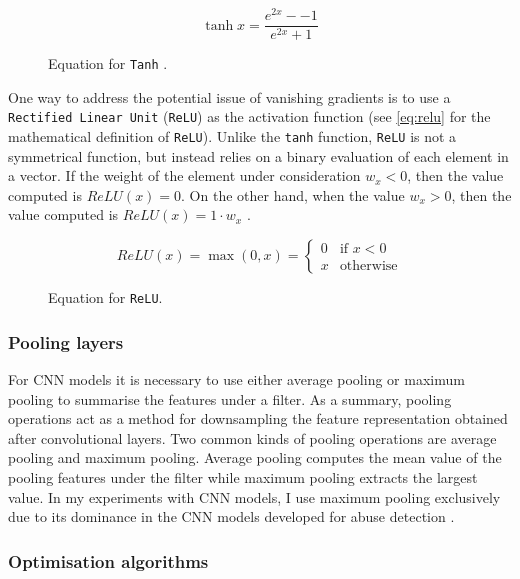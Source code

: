 \begin{figure}[h]
  \begin{equation}\label{eq:tanh}
    \tanh{x} = \dfrac{e^{2x} - -1}{e^{2x} + 1} 
  \end{equation}
  \caption{Equation for \texttt{Tanh} \citep{Goldberg:2017}.}
\end{figure}

One way to address the potential issue of vanishing gradients is to use a \texttt{Rectified Linear Unit} (\texttt{ReLU}) as the activation function (see \cref{eq:relu} for the mathematical definition of \texttt{ReLU}). 
Unlike the \texttt{tanh} function, \texttt{ReLU} is not a symmetrical function, but instead relies on a binary evaluation of each element in a vector. 
If the weight of the element under consideration $w_x < 0$, then the value computed is $\mathit{ReLU}(x) = 0$. 
On the other hand, when the value $w_x > 0$, then the value computed is $\mathit{ReLU}(x) = 1 \cdot w_x$ \citep{Teuwen:2020}.

\begin{figure}[h]
\begin{equation}\label{eq:relu}
  \mathit{ReLU (x)} = \max{(0, x)} = 
  \begin{cases}
   0 & \text{if } x < 0\\
   x & \text{otherwise}
  \end{cases}
\end{equation}
\caption{Equation for \texttt{ReLU}.}
\end{figure}

\subsubsection{Pooling layers}\label{sub:pooling}
For CNN models it is necessary to use either average pooling or maximum pooling to summarise the features under a filter. 
As a summary, pooling operations act as a method for downsampling the feature representation obtained after convolutional layers. 
Two common kinds of pooling operations are average pooling and maximum pooling.
Average pooling computes the mean value of the pooling features under the filter while maximum pooling extracts the largest value. 
In my experiments with CNN models, I use maximum pooling exclusively due to its dominance in the CNN models developed for abuse detection \citep{Kolhatkar:2020}.

\subsubsection{Optimisation algorithms}

